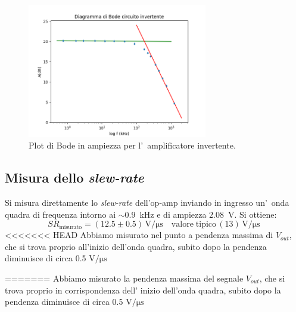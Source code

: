\documentclass[10pt,a4paper]{article}
\begin{document}
\begin{table}[h]
\begin{center}
\begin{tabular}{|c|c|c|c|}
				\hline
			\end{tabular}
		\end{center}
	\end{table} 
	
	
	
	\begin{figure}[h]
		\begin{center}
			
			\includegraphics[width=0.7\textwidth]{bodeInvertente}
			\caption{\small Plot di Bode in ampiezza per l'~amplificatore invertente.}
			\label{fig:bodeinv}
		\end{center}
	\end{figure}
	\subsection{Misura dello \emph{slew-rate}}
	Si misura direttamente lo \emph{slew-rate} dell'op-amp inviando in ingresso un'~onda quadra 
	di frequenza intorno ai $\sim 0.9$~kHz e di ampiezza $2.08$~V. Si ottiene:
	\[
	SR_\mathrm{misurato} = (12.5 \pm 0.5 )\,\mathrm{V/\mu s} \quad \mathrm{valore \; tipico}\, (13 )\,\mathrm{V/\mu s}\
	\]
<<<<<<< HEAD
Abbiamo misurato nel  punto a pendenza massima di $V_{out}$, che si trova proprio all'inizio dell'onda quadra, subito dopo la pendenza diminuisce di circa 0.5 $ \mathrm{V/\mu s}$

=======
Abbiamo misurato la  pendenza massima del segnale $V_{out}$, che si trova proprio  in corrispondenza dell' inizio dell'onda quadra, subito dopo la pendenza diminuisce di circa 0.5 $ \mathrm{V/\mu s}$
\end{document}

